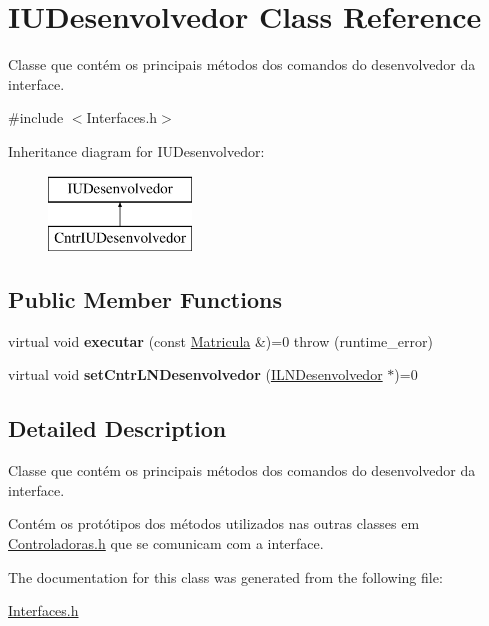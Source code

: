 \hypertarget{class_i_u_desenvolvedor}{}\section{I\+U\+Desenvolvedor Class Reference}
\label{class_i_u_desenvolvedor}


Classe que contém os principais métodos dos comandos do desenvolvedor da interface.  




{\ttfamily \#include $<$Interfaces.\+h$>$}

Inheritance diagram for I\+U\+Desenvolvedor\+:\begin{figure}[H]
\begin{center}
\leavevmode
\includegraphics[height=2.000000cm]{class_i_u_desenvolvedor}
\end{center}
\end{figure}
\subsection*{Public Member Functions}
\begin{DoxyCompactItemize}
\item 
\hypertarget{class_i_u_desenvolvedor_a29c83b313e9ce403307ba7a5d54ce4a4}{}\label{class_i_u_desenvolvedor_a29c83b313e9ce403307ba7a5d54ce4a4} 
virtual void {\bfseries executar} (const \hyperlink{class_matricula}{Matricula} \&)=0  throw (runtime\+\_\+error)
\item 
\hypertarget{class_i_u_desenvolvedor_ad7e6fc192a682a9b4d3dd07866d9cc05}{}\label{class_i_u_desenvolvedor_ad7e6fc192a682a9b4d3dd07866d9cc05} 
virtual void {\bfseries set\+Cntr\+L\+N\+Desenvolvedor} (\hyperlink{class_i_l_n_desenvolvedor}{I\+L\+N\+Desenvolvedor} $\ast$)=0
\end{DoxyCompactItemize}


\subsection{Detailed Description}
Classe que contém os principais métodos dos comandos do desenvolvedor da interface. 

Contém os protótipos dos métodos utilizados nas outras classes em \hyperlink{_controladoras_8h}{Controladoras.\+h} que se comunicam com a interface. 

The documentation for this class was generated from the following file\+:\begin{DoxyCompactItemize}
\item 
\hyperlink{_interfaces_8h}{Interfaces.\+h}\end{DoxyCompactItemize}
